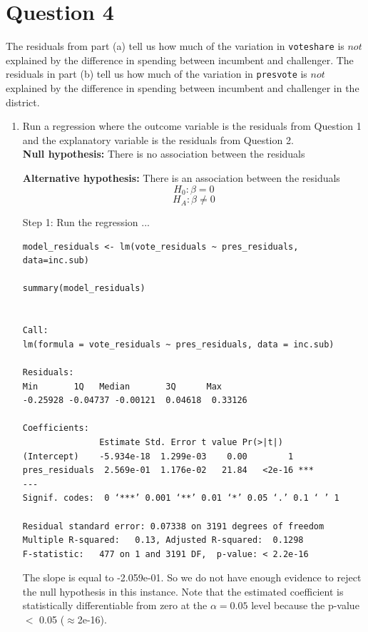 \documentclass[12pt,letterpaper]{article}
\begin{document}
\section*{Question 4}
\noindent The residuals from part (a) tell us how much of the variation in \texttt{voteshare} is $not$ explained by the difference in spending between incumbent and challenger. The residuals in part (b) tell us how much of the variation in \texttt{presvote} is $not$ explained by the difference in spending between incumbent and challenger in the district.
	\begin{enumerate}
		\item Run a regression where the outcome variable is the residuals from Question 1 and the explanatory variable is the residuals from Question 2.	\\
		
\textbf{		Null hypothesis: }
		There is no association between the residuals
		
\textbf{		Alternative hypothesis: }
		There is an association between the residuals \\

	$$H_0: \beta = 0$$
$$H_A: \beta \neq 0$$

\vspace{.25cm}


Step 1: Run the regression ...

			\begin{verbatim}
model_residuals <- lm(vote_residuals ~ pres_residuals, data=inc.sub)

summary(model_residuals)


Call:
lm(formula = vote_residuals ~ pres_residuals, data = inc.sub)

Residuals:
Min       1Q   Median       3Q      Max 
-0.25928 -0.04737 -0.00121  0.04618  0.33126 

Coefficients:
               Estimate Std. Error t value Pr(>|t|)    
(Intercept)    -5.934e-18  1.299e-03    0.00        1    
pres_residuals  2.569e-01  1.176e-02   21.84   <2e-16 ***
---
Signif. codes:  0 ‘***’ 0.001 ‘**’ 0.01 ‘*’ 0.05 ‘.’ 0.1 ‘ ’ 1

Residual standard error: 0.07338 on 3191 degrees of freedom
Multiple R-squared:   0.13,	Adjusted R-squared:  0.1298 
F-statistic:   477 on 1 and 3191 DF,  p-value: < 2.2e-16

		\end{verbatim}
		
The slope is equal to -2.059e-01. So we do not have enough evidence to reject the null hypothesis in this instance. Note that the estimated coefficient is statistically differentiable from zero at the $\alpha=0.05$ level because the p-value  $<$ 0.05 ($\approx $2e-16).
	

\end{enumerate}
\end{document}
